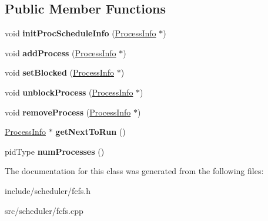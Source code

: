 \subsection*{\-Public \-Member \-Functions}
\begin{DoxyCompactItemize}
\item 
\hypertarget{classcFCFS_aff34f18c6f4c3f38029d904cd2ec55de}{void {\bfseries init\-Proc\-Schedule\-Info} (\hyperlink{structProcessInfo}{\-Process\-Info} $\ast$)}\label{d6/dc3/classcFCFS_aff34f18c6f4c3f38029d904cd2ec55de}

\item 
\hypertarget{classcFCFS_a25d4bf440041f5294f3b9c5aff20b411}{void {\bfseries add\-Process} (\hyperlink{structProcessInfo}{\-Process\-Info} $\ast$)}\label{d6/dc3/classcFCFS_a25d4bf440041f5294f3b9c5aff20b411}

\item 
\hypertarget{classcFCFS_a1b8ee3a759a31032ec7c1cd7b15ed5df}{void {\bfseries set\-Blocked} (\hyperlink{structProcessInfo}{\-Process\-Info} $\ast$)}\label{d6/dc3/classcFCFS_a1b8ee3a759a31032ec7c1cd7b15ed5df}

\item 
\hypertarget{classcFCFS_a793da0298f9b36ab8505a0e3daaf41ec}{void {\bfseries unblock\-Process} (\hyperlink{structProcessInfo}{\-Process\-Info} $\ast$)}\label{d6/dc3/classcFCFS_a793da0298f9b36ab8505a0e3daaf41ec}

\item 
\hypertarget{classcFCFS_aeeac757885108ae510b728600ebba248}{void {\bfseries remove\-Process} (\hyperlink{structProcessInfo}{\-Process\-Info} $\ast$)}\label{d6/dc3/classcFCFS_aeeac757885108ae510b728600ebba248}

\item 
\hypertarget{classcFCFS_aa2b92a8a992078e499aab455c9d78faf}{\hyperlink{structProcessInfo}{\-Process\-Info} $\ast$ {\bfseries get\-Next\-To\-Run} ()}\label{d6/dc3/classcFCFS_aa2b92a8a992078e499aab455c9d78faf}

\item 
\hypertarget{classcFCFS_a0a72de791436a84120a534dd2fa0485d}{pid\-Type {\bfseries num\-Processes} ()}\label{d6/dc3/classcFCFS_a0a72de791436a84120a534dd2fa0485d}

\end{DoxyCompactItemize}


\-The documentation for this class was generated from the following files\-:\begin{DoxyCompactItemize}
\item 
include/scheduler/fcfs.\-h\item 
src/scheduler/fcfs.\-cpp\end{DoxyCompactItemize}

